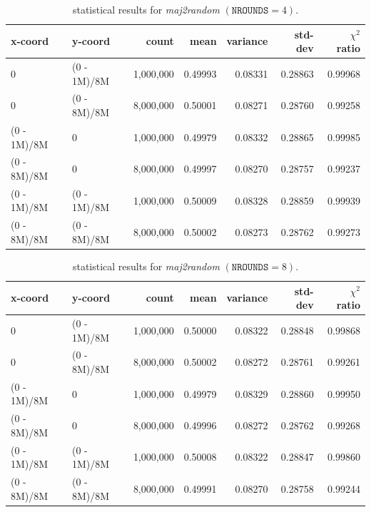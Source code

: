 \documentclass{scrartcl}
\begin{document}
\begin{table}[h]
\centering
\small
\begin{tabular}{llrrrrr}
\hline
\textbf{x-coord} & \textbf{y-coord} & \textbf{count} & \textbf{mean} &
\textbf{variance} & \textbf{std-dev} & \textbf{$\chi^2$ ratio} \\
\hline
          0 & (0 - 1M)/8M  & 1,000,000 & 0.49993 & 0.08331 & 0.28863 & 0.99968 \\
          0 & (0 - 8M)/8M  & 8,000,000 & 0.50001 & 0.08271 & 0.28760 & 0.99258 \\
(0 - 1M)/8M &           0  & 1,000,000 & 0.49979 & 0.08332 & 0.28865 & 0.99985 \\
(0 - 8M)/8M &           0  & 8,000,000 & 0.49997 & 0.08270 & 0.28757 & 0.99237 \\
(0 - 1M)/8M & (0 - 1M)/8M  & 1,000,000 & 0.50009 & 0.08328 & 0.28859 & 0.99939 \\
(0 - 8M)/8M & (0 - 8M)/8M  & 8,000,000 & 0.50002 & 0.08273 & 0.28762 & 0.99273 \\
\hline
\end{tabular}
\caption{statistical results for \emph{maj2random} $(\mathtt{NROUNDS}=4)$.}
\end{table}

\begin{table}[h]
\centering
\small
\begin{tabular}{llrrrrr}
\hline
\textbf{x-coord} & \textbf{y-coord} & \textbf{count} & \textbf{mean} &
\textbf{variance} & \textbf{std-dev} & \textbf{$\chi^2$ ratio} \\
\hline
          0 & (0 - 1M)/8M  & 1,000,000 & 0.50000 & 0.08322 & 0.28848 & 0.99868 \\
          0 & (0 - 8M)/8M  & 8,000,000 & 0.50002 & 0.08272 & 0.28761 & 0.99261 \\
(0 - 1M)/8M &           0  & 1,000,000 & 0.49979 & 0.08329 & 0.28860 & 0.99950 \\
(0 - 8M)/8M &           0  & 8,000,000 & 0.49996 & 0.08272 & 0.28762 & 0.99268 \\
(0 - 1M)/8M & (0 - 1M)/8M  & 1,000,000 & 0.50008 & 0.08322 & 0.28847 & 0.99860 \\
(0 - 8M)/8M & (0 - 8M)/8M  & 8,000,000 & 0.49991 & 0.08270 & 0.28758 & 0.99244 \\
\hline
\end{tabular}
\caption{statistical results for \emph{maj2random} $(\mathtt{NROUNDS}=8)$.}
\end{table}

\vspace{1em}
\end{document}
